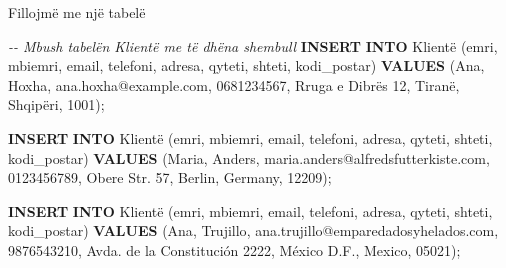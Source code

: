 \documentclass[
  ignorenonframetext,
]{beamer}
\newenvironment{Shaded}{\begin{snugshade}}{\end{snugshade}}
\newcommand{\CommentTok}[1]{\textcolor[rgb]{0.56,0.35,0.01}{\textit{#1}}}
\newcommand{\KeywordTok}[1]{\textcolor[rgb]{0.13,0.29,0.53}{\textbf{#1}}}
\newcommand{\NormalTok}[1]{#1}
\newcommand{\StringTok}[1]{\textcolor[rgb]{0.31,0.60,0.02}{#1}}
\begin{document}
\begin{frame}[fragile]{Fillojmë me një tabelë}
\label{fillojmuxeb-me-njuxeb-tabeluxeb-1}

\begin{Shaded}
\begin{Highlighting}[]
\CommentTok{{-}{-} Mbush tabelën Klientë me të dhëna shembull}
\KeywordTok{INSERT} \KeywordTok{INTO}\NormalTok{ Klientë (emri, mbiemri, email, telefoni, adresa, qyteti, shteti, kodi\_postar)}
\KeywordTok{VALUES}\NormalTok{ (}\StringTok{\textquotesingle{}Ana\textquotesingle{}}\NormalTok{, }\StringTok{\textquotesingle{}Hoxha\textquotesingle{}}\NormalTok{, }\StringTok{\textquotesingle{}ana.hoxha@example.com\textquotesingle{}}\NormalTok{, }\StringTok{\textquotesingle{}0681234567\textquotesingle{}}\NormalTok{, }\StringTok{\textquotesingle{}Rruga e Dibrës 12\textquotesingle{}}\NormalTok{, }\StringTok{\textquotesingle{}Tiranë\textquotesingle{}}\NormalTok{, }\StringTok{\textquotesingle{}Shqipëri\textquotesingle{}}\NormalTok{, }\StringTok{\textquotesingle{}1001\textquotesingle{}}\NormalTok{);}

\KeywordTok{INSERT} \KeywordTok{INTO}\NormalTok{ Klientë (emri, mbiemri, email, telefoni, adresa, qyteti, shteti, kodi\_postar)}
\KeywordTok{VALUES}\NormalTok{ (}\StringTok{\textquotesingle{}Maria\textquotesingle{}}\NormalTok{, }\StringTok{\textquotesingle{}Anders\textquotesingle{}}\NormalTok{, }\StringTok{\textquotesingle{}maria.anders@alfredsfutterkiste.com\textquotesingle{}}\NormalTok{, }\StringTok{\textquotesingle{}0123456789\textquotesingle{}}\NormalTok{, }\StringTok{\textquotesingle{}Obere Str. 57\textquotesingle{}}\NormalTok{, }\StringTok{\textquotesingle{}Berlin\textquotesingle{}}\NormalTok{, }\StringTok{\textquotesingle{}Germany\textquotesingle{}}\NormalTok{, }\StringTok{\textquotesingle{}12209\textquotesingle{}}\NormalTok{);}

\KeywordTok{INSERT} \KeywordTok{INTO}\NormalTok{ Klientë (emri, mbiemri, email, telefoni, adresa, qyteti, shteti, kodi\_postar)}
\KeywordTok{VALUES}\NormalTok{ (}\StringTok{\textquotesingle{}Ana\textquotesingle{}}\NormalTok{, }\StringTok{\textquotesingle{}Trujillo\textquotesingle{}}\NormalTok{, }\StringTok{\textquotesingle{}ana.trujillo@emparedadosyhelados.com\textquotesingle{}}\NormalTok{, }\StringTok{\textquotesingle{}9876543210\textquotesingle{}}\NormalTok{, }\StringTok{\textquotesingle{}Avda. de la Constitución 2222\textquotesingle{}}\NormalTok{, }\StringTok{\textquotesingle{}México D.F.\textquotesingle{}}\NormalTok{, }\StringTok{\textquotesingle{}Mexico\textquotesingle{}}\NormalTok{, }\StringTok{\textquotesingle{}05021\textquotesingle{}}\NormalTok{);}


\end{Highlighting}
\end{Shaded}
\end{frame}
\end{document}
